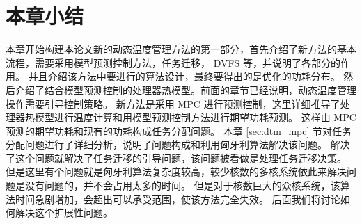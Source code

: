  
  

 

\section{本章小结}\label{sec:xiaojie4}
本章开始构建本论文新的动态温度管理方法的第一部分，首先介绍了新方法的基本流程，需要采用模型预测控制方法，任务迁移， DVFS 等，并说明了各部分的作用。
并且介绍该方法中要进行的算法设计，最终要得出的是优化的功耗分布。
然后介绍了结合模型预测控制的处理器热模型。前面的章节已经说明，动态温度管理操作需要引导控制策略。
新方法是采用 MPC 进行预测控制，这里详细推导了处理器热模型进行温度计算和用模型预测控制方法进行期望功耗预测。
这样由 MPC 预测的期望功耗和现有的功耗构成任务分配问题。
本章  \ref{sec:dtm_mpc} 节对任务分配问题进行了详细分析，说明了问题构成和利用匈牙利算法解决该问题。
解决了这个问题就解决了任务迁移的引导问题，该问题被看做是处理任务迁移决策。
但是这里有个问题就是匈牙利算法复杂度较高，较少核数的多核系统依此来解决问题是没有问题的，并不会占用太多的时间。
但是对于核数巨大的众核系统，该算法时间急剧增加，会超出可以承受范围，使该方法完全失效。
后面我们将讨论如何解决这个扩展性问题。





























